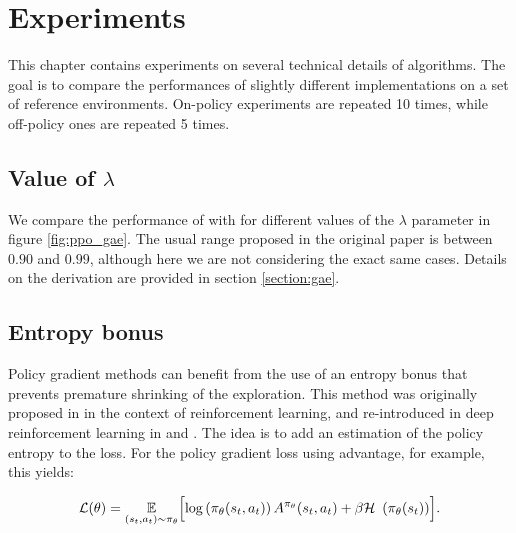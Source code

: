\chapter{Experiments}

This chapter contains experiments on several technical details of algorithms. The goal is to compare the performances of slightly different implementations on a set of reference environments. On-policy experiments are repeated 10 times, while off-policy ones are repeated 5 times.

\section{Value of \gae $\lambda$}

We compare the performance of \ppo with \gae for different values of the $\lambda$ parameter in figure \ref{fig:ppo_gae}. The usual range proposed in the original paper \cite{gae} is between $0.90$ and $0.99$, although here we are not considering the exact same cases. Details on the \gae derivation are provided in section \ref{section:gae}.



\section{Entropy bonus}

Policy gradient methods can benefit from the use of an entropy bonus that prevents premature shrinking of the exploration. This method was originally proposed in \cite{williams1991} in the context of reinforcement learning, and re-introduced in deep reinforcement learning in \cite{a2c} and \cite{ppo}. The idea is to add an estimation of the policy entropy to the loss. For the policy gradient loss using advantage, for example, this yields:

\begin{equation}
	\mathcal{L}(\theta) = \expect{(s_t, a_t) \sim \pi_\theta} \Bigl[ \log \left( \pi_\theta (s_t, a_t) \right) A^{\pi_\theta} (s_t, a_t) + \beta \entropy \left( \pi_\theta (s_t) \right) \Bigr].
\end{equation}

